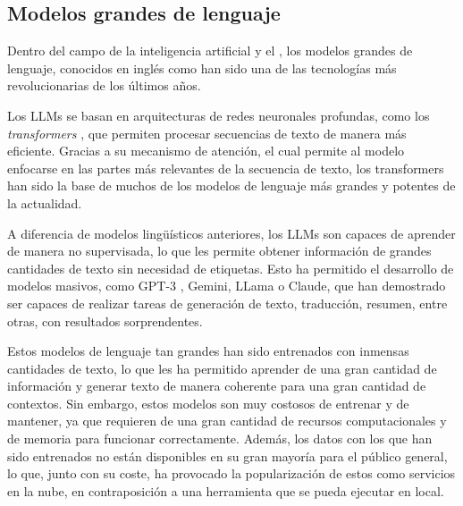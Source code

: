 \subsection{Modelos grandes de lenguaje}
Dentro del campo de la inteligencia artificial y el , los modelos grandes de lenguaje, conocidos en inglés como  han sido una de las tecnologías más revolucionarias de los últimos años.

Los \ac{LLM}s se basan en arquitecturas de redes neuronales profundas, como los \textit{transformers} \cite{attention2017}, que permiten procesar secuencias de texto de manera más eficiente. Gracias a su mecanismo de atención, el cual permite al modelo enfocarse en las partes más relevantes de la secuencia de texto, los transformers han sido la base de muchos de los modelos de lenguaje más grandes y potentes de la actualidad.

A diferencia de modelos lingüísticos anteriores, los \ac{LLM}s son capaces de aprender de manera no supervisada, lo que les permite obtener información de grandes cantidades de texto sin necesidad de etiquetas. Esto ha permitido el desarrollo de modelos masivos, como GPT-3 \cite{gpt32020}, Gemini, LLama o Claude, que han demostrado ser capaces de realizar tareas de generación de texto, traducción, resumen, entre otras, con resultados sorprendentes.

Estos modelos de lenguaje tan grandes han sido entrenados con inmensas cantidades de texto, lo que les ha permitido aprender de una gran cantidad de información y generar texto de manera coherente para una gran cantidad de contextos. Sin embargo, estos modelos son muy costosos de entrenar y de mantener, ya que requieren de una gran cantidad de recursos computacionales y de memoria para funcionar correctamente. Además, los datos con los que han sido entrenados no están disponibles en su gran mayoría para el público general, lo que, junto con su coste, ha provocado la popularización de estos como servicios en la nube, en contraposición a una herramienta que se pueda ejecutar en local.